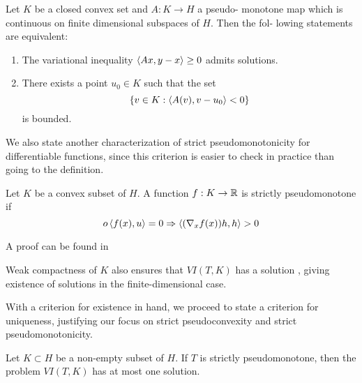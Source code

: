 \begin{theorem}
  \label{thm:existence}
  Let $K$ be a closed convex set and $A : K \to H$  a pseudo-
  monotone map which is continuous on finite dimensional subspaces of $H$. Then the fol-
  lowing statements are equivalent:
\end{theorem}
\begin{enumerate}
  \item The variational inequality $\left \langle Ax,y-x \right \rangle \geq 0$ admits solutions.
  \item There exists a point $u_0 \in K$ such that the set
  \begin{equation}
    \{v \in K : \left \langle A(v),v-u_0 \right \rangle < 0\}
  \end{equation}
  is bounded.
\end{enumerate}
We also state another characterization of strict pseudomonotonicity for differentiable functions, since this criterion is easier to check in practice than going to the definition.
\begin{lemma}
  \label{lem:strict_pm}
  Let $K$ be a convex subset of $H$. A function $f: K \to \mathbb{R}$ is strictly pseudomonotone if
  \begin{equation}o
    \left \langle f(x),u \right \rangle = 0 \Rightarrow \left \langle (\nabla_x f(x))h,h \right \rangle > 0
  \end{equation}
\end{lemma}
A proof can be found in \citep[Proposition 2.8, p.96]{hadjisavvas2006handbook}

\begin{comment}

\citep[Theorem 3.6]{maugeri2009existence}, which we restate.
\begin{theorem}
  \label{thm:existence}
  Let $K\subset H$ be a closed convex set and $T:K\to H$ a pseudomonotone operator which is lower hemicontinuous along line segments, i.e. for all $x,y\in H$ the mapping $\xi \mapsto \ip{T\xi,}{x-y}$ is lower semicontinuous for $\xi \in \{\eta \in H : \eta = tx+(1-t)y, \quad t\in [0,1]\}$. Assume that there exists $u_0 \in K$ and $R> \norm{u_0}$ such that
  \begin{equation}
    \ip{Tv}{v-u_0} \geq 0, \forall v \in K \cap \{v \in H : \norm{v} = R \}
  \end{equation}
  then the variational inequality $VI(T,K)$ has a solution.
\end{theorem}
\end{comment}
\begin{remark}
  \label{rem:weak_compact}
  Weak compactness of $K$ also ensures that $VI(T,K)$ has a solution \citep[Theorem 12.1, P. 510]{hadjisavvas2006handbook}, giving existence of solutions in the finite-dimensional case.
\end{remark}
With a criterion for existence in hand, we proceed to state a criterion for uniqueness, justifying our focus on strict pseudoconvexity and strict pseudomonotonicity.
\begin{theorem}
  \label{thm:uniqueness}
  Let $K\subset H$ be a non-empty subset of $H$. If $T$ is strictly pseudomonotone, then the problem $VI(T,K)$ has at most one solution.
\end{theorem}

